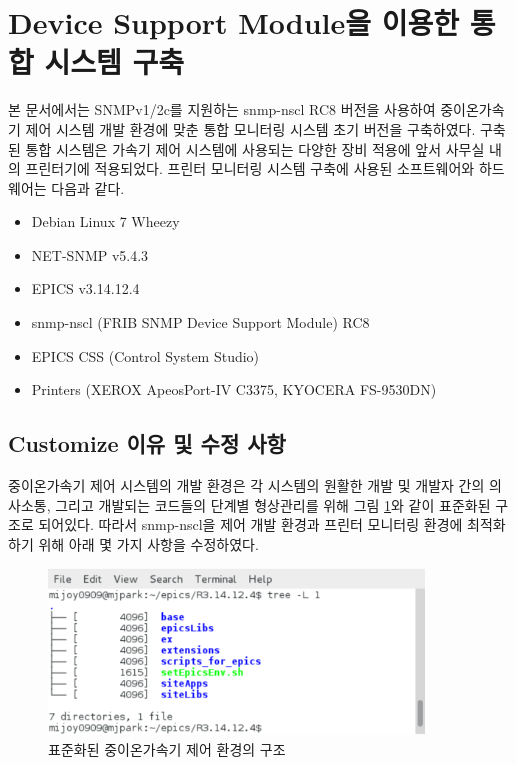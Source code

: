 \documentclass[11pt
  , a4paper
  , article
  , oneside
]{memoir}
\begin{document}
\clearpage

\section{Device Support Module을 이용한 통합 시스템 구축}
본 문서에서는 SNMPv1/2c를 지원하는 snmp-nscl RC8 버전을 사용하여 중이온가속기 제어 시스템 개발 환경에 맞춘 통합 모니터링 시스템 초기 버전을 구축하였다. 구축된 통합 시스템은 가속기 제어 시스템에 사용되는 다양한 장비 적용에 앞서 사무실 내의 프린터기에 적용되었다. 프린터 모니터링 시스템 구축에 사용된 소프트웨어와 하드웨어는 다음과 같다.

\begin{itemize}
\item Debian Linux 7 Wheezy
\item NET-SNMP v5.4.3
\item EPICS v3.14.12.4
\item snmp-nscl (FRIB SNMP Device Support Module) RC8
\item EPICS CSS (Control System Studio)
\item Printers (XEROX ApeosPort-IV C3375, KYOCERA FS-9530DN)
\end{itemize}

\subsection{Customize 이유 및 수정 사항}
중이온가속기 제어 시스템의 개발 환경은 각 시스템의 원활한 개발 및 개발자 간의 의사소통, 그리고 개발되는 코드들의 단계별 형상관리를 위해 그림 \ref{fig:epicstree}와 같이 표준화된 구조로 되어있다\citep{epicsev}. 따라서 snmp-nscl을 제어 개발 환경과 프린터 모니터링 환경에 최적화하기 위해 아래 몇 가지 사항을 수정하였다.

\begin{figure}[h!]
  \centering
  \includegraphics[width=0.89\textwidth]{./images/epicstree.eps}
  \caption{표준화된 중이온가속기 제어 환경의 구조}
  \label{fig:epicstree}   
\end{figure}
\end{document}
